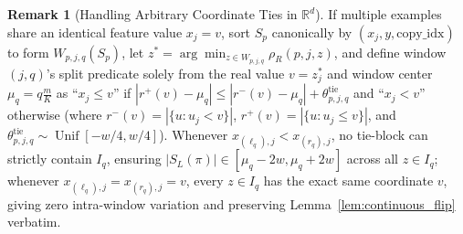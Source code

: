 \documentclass[11pt]{article}
\theoremstyle{definition}
\newtheorem{remark}{Remark}
\newcommand{\R}{\mathbb{R}}
\newcommand{\Unif}{\operatorname{Unif}}
\begin{document}
\begin{remark}[Handling Arbitrary Coordinate Ties in $\R^d$]
\label{rem:ties}
If multiple examples share an identical feature value $x_j = v$, sort $S_p$ canonically by $(x_j, y, \text{copy\_idx})$ to form $W_{p,j,q}(S_p)$, let $z^* = \arg\min_{z \in W_{p,j,q}} \rho_R(p, j, z)$, and define window $(j,q)$'s split predicate solely from the real value $v = z^*_j$ and window center $\mu_q = q\frac{m}{K}$ as ``$x_j \le v$'' if $|r^+(v) - \mu_q| \le |r^-(v) - \mu_q| + \theta^{\text{tie}}_{p,j,q}$ and ``$x_j < v$'' otherwise (where $r^-(v) = |\{u : u_j < v\}|$, $r^+(v) = |\{u : u_j \le v\}|$, and $\theta^{\text{tie}}_{p,j,q} \sim \Unif[-w/4, w/4]$). Whenever $x_{(\ell_q), j} < x_{(r_q), j}$, no tie-block can strictly contain $I_q$, ensuring $|S_L(\pi)| \in [\mu_q - 2w, \mu_q + 2w]$ across all $z \in I_q$; whenever $x_{(\ell_q), j} = x_{(r_q), j} = v$, every $z \in I_q$ has the exact same coordinate $v$, giving zero intra-window variation and preserving Lemma~\ref{lem:continuous_flip} verbatim.
\end{remark}
\end{document}
